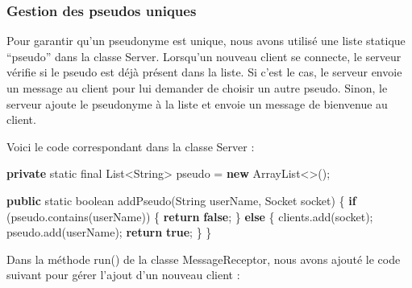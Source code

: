 \documentclass[
]{article}
\newenvironment{Shaded}{}{}
\newcommand{\BuiltInTok}[1]{#1}
\newcommand{\DataTypeTok}[1]{\textcolor[rgb]{0.56,0.13,0.00}{#1}}
\newcommand{\FunctionTok}[1]{\textcolor[rgb]{0.02,0.16,0.49}{#1}}
\newcommand{\KeywordTok}[1]{\textcolor[rgb]{0.00,0.44,0.13}{\textbf{#1}}}
\newcommand{\NormalTok}[1]{#1}
\begin{document}
\hypertarget{gestion-des-pseudos-uniques}{%
\subsubsection{Gestion des pseudos
uniques}\label{gestion-des-pseudos-uniques}}

Pour garantir qu'un pseudonyme est unique, nous avons utilisé une liste
statique ``pseudo'' dans la classe Server. Lorsqu'un nouveau client se
connecte, le serveur vérifie si le pseudo est déjà présent dans la
liste. Si c'est le cas, le serveur envoie un message au client pour lui
demander de choisir un autre pseudo. Sinon, le serveur ajoute le
pseudonyme à la liste et envoie un message de bienvenue au client.

Voici le code correspondant dans la classe Server :

\begin{Shaded}
\begin{Highlighting}[]
\KeywordTok{private} \DataTypeTok{static} \DataTypeTok{final} \BuiltInTok{List}\NormalTok{\textless{}}\BuiltInTok{String}\NormalTok{\textgreater{} pseudo = }\KeywordTok{new} \BuiltInTok{ArrayList}\NormalTok{\textless{}\textgreater{}();}

\KeywordTok{public} \DataTypeTok{static} \DataTypeTok{boolean} \FunctionTok{addPseudo}\NormalTok{(}\BuiltInTok{String}\NormalTok{ userName, }\BuiltInTok{Socket}\NormalTok{ socket) \{}
    \KeywordTok{if}\NormalTok{ (pseudo.}\FunctionTok{contains}\NormalTok{(userName)) \{}
        \KeywordTok{return} \KeywordTok{false}\NormalTok{;}
\NormalTok{    \} }\KeywordTok{else}\NormalTok{ \{}
\NormalTok{        clients.}\FunctionTok{add}\NormalTok{(socket);}
\NormalTok{        pseudo.}\FunctionTok{add}\NormalTok{(userName);}
        \KeywordTok{return} \KeywordTok{true}\NormalTok{;}
\NormalTok{    \}}
\NormalTok{\}}
\end{Highlighting}
\end{Shaded}

Dans la méthode run() de la classe MessageReceptor, nous avons ajouté le
code suivant pour gérer l'ajout d'un nouveau client :
\end{document}
